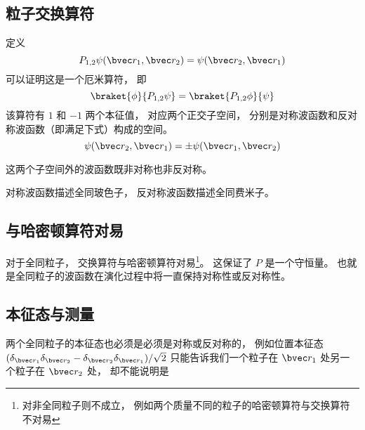 

\subsection{粒子交换算符}

定义
\begin{equation}
P_{1,2}\psi(\bvec r_1, \bvec r_2) = \psi(\bvec r_2, \bvec r_1)
\end{equation}
可以证明这是一个厄米算符， 即
\begin{equation}
\braket{\phi}{P_{1,2}\psi} = \braket{P_{1,2}\phi}{\psi}
\end{equation}
该算符有 $1$ 和 $-1$ 两个本征值， 对应两个正交子空间， 分别是对称波函数和反对称波函数（即满足下式）构成的空间。
\begin{equation}
\psi(\bvec r_2, \bvec r_1) = \pm\psi(\bvec r_1, \bvec r_2)
\end{equation}

这两个子空间外的波函数既非对称也非反对称。

对称波函数描述全同玻色子， 反对称波函数描述全同费米子。

\subsection{与哈密顿算符对易}

对于全同粒子， 交换算符与哈密顿算符对易\footnote{对非全同粒子则不成立， 例如两个质量不同的粒子的哈密顿算符与交换算符不对易}。 这保证了 $P$ 是一个守恒量。 也就是全同粒子的波函数在演化过程中将一直保持对称性或反对称性。

\subsection{本征态与测量}
两个全同粒子的本征态也必须是必须是对称或反对称的， 例如位置本征态 $(\delta_{\bvec r_1} \delta_{\bvec r_2}-\delta_{\bvec r_2} \delta_{\bvec r_1})/\sqrt 2$ 只能告诉我们一个粒子在 $\bvec r_1$ 处另一个粒子在 $\bvec r_2$ 处， 却不能说明是
